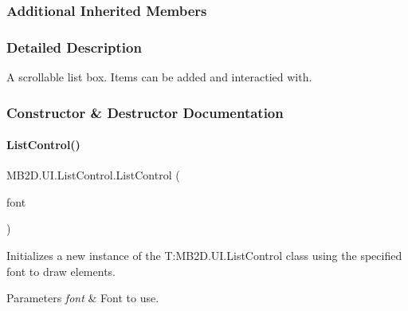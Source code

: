 \subsubsection*{Additional Inherited Members}


\subsubsection{Detailed Description}
A scrollable list box. Items can be added and interactied with. 



\subsubsection{Constructor \& Destructor Documentation}
\hypertarget{class_m_b2_d_1_1_u_i_1_1_list_control_a7248e2ea186e805d76e9c6c84986f85c}{}\label{class_m_b2_d_1_1_u_i_1_1_list_control_a7248e2ea186e805d76e9c6c84986f85c} 
\paragraph{\texorpdfstring{List\+Control()}{ListControl()}\hspace{0.1cm}{\footnotesize\ttfamily [1/2]}}
{\footnotesize\ttfamily M\+B2\+D.\+U\+I.\+List\+Control.\+List\+Control (\begin{DoxyParamCaption}\item[{Sprite\+Font}]{font }\end{DoxyParamCaption})\hspace{0.3cm}{\ttfamily [inline]}}



Initializes a new instance of the T\+:\+M\+B2\+D.\+U\+I.\+List\+Control class using the specified font to draw elements. 


\begin{DoxyParams}{Parameters}
{\em font} & Font to use.\\
\hline
\end{DoxyParams}
\hypertarget{class_m_b2_d_1_1_u_i_1_1_list_control_af89e91c17451a74cb0edbada9a1c0d17}{}\label{class_m_b2_d_1_1_u_i_1_1_list_control_af89e91c17451a74cb0edbada9a1c0d17} 
